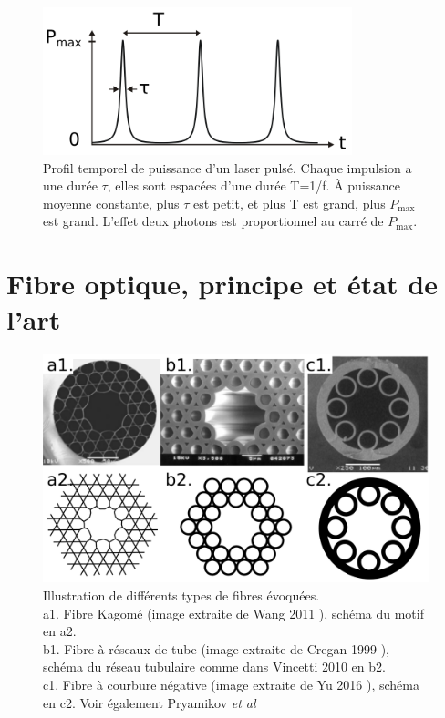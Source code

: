 \begin{figure}
\centering
\includegraphics[width=0.8\textwidth]{./files/pulsed_laser.svg.png}
\caption{Profil temporel de puissance d'un laser pulsé. Chaque impulsion a une durée $\tau$, elles sont espacées d'une durée T=1/f. À puissance moyenne constante, plus $\tau$ est petit, et plus T est grand, plus $P_\text{max}$ est grand. L'effet deux photons est proportionnel au carré de $P_\text{max}$.
}
\label{pulsed-laser}
\end{figure}


\section{Fibre optique, principe et état de l'art}


\begin{figure}
\centering
\includegraphics[width=1\textwidth]{./files/fibers.svg.png}
\caption{Illustration de différents types de fibres évoquées.\\
a1. Fibre Kagomé (image extraite de Wang 2011 \cite{wang_low_2011}), schéma du motif en a2.\\
b1. Fibre à réseaux de tube (image extraite de Cregan 1999 \cite{cregan_single-mode_1999}), schéma du réseau tubulaire comme dans Vincetti 2010 \cite{vincetti_waveguiding_2010} en b2.\\
c1. Fibre à courbure négative (image extraite de Yu 2016 \cite{yu_negative_2016}), schéma en c2. Voir également Pryamikov \emph{et al} \cite{pryamikov_demonstration_2011} \\}
\end{figure}

